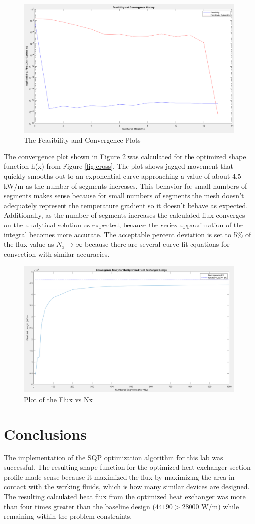 \documentclass[11pt]{article}%
\begin{document}
\begin{figure}[h!]
    \centering
    \includegraphics[width=0.75\linewidth]{feasibility.png}
    \caption{ The Feasibility and Convergence Plots }
    \label{fig:feas}
\end{figure}
\medskip
The convergence plot shown in Figure \ref{fig:conv} was calculated for the optimized shape function h(x) from Figure \ref{fig:cross}.  The plot shows jagged movement that quickly smooths out to an exponential curve approaching a value of about 4.5 kW/m as the number of segments increases. This behavior for small numbers of segments makes sense because for small numbers of segments the mesh doesn't adequately represent the temperature gradient so it doesn't behave as expected. Additionally, as the number of segments increases the calculated flux converges on the analytical solution as expected, because the series approximation of the integral becomes more accurate. The acceptable percent deviation is set to 5\% of the flux value as $N_{x}\rightarrow\infty$ because there are several curve fit equations for convection with similar accuracies.
\begin{figure}[h!]
    \centering
    \includegraphics[width=0.75\linewidth]{converg.png}
    \caption{ Plot of the Flux vs Nx }
    \label{fig:conv}
\end{figure}
\section{Conclusions}
The implementation of the SQP optimization algorithm for this lab was successful. The resulting shape function for the optimized heat exchanger section profile made sense because it maximized the flux by maximizing the area in contact with the working fluids, which is how many similar devices are designed. The resulting calculated heat flux from the optimized heat exchanger was more than four times greater than the baseline design ($44190 > 28000 $ W/m) while remaining within the problem constraints. 
\end{document}
